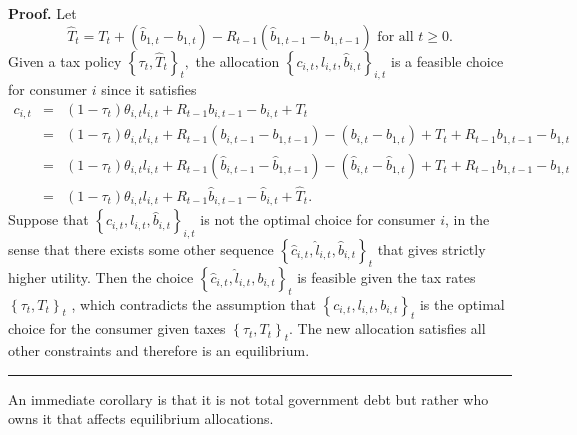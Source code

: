 \documentclass[thmsb,11pt]{article}
\newenvironment{proof}[1][Proof]{\noindent \textbf{#1.} }{\  \rule{0.5em}{0.5em}}
\begin{document}
\begin{proof}
Let
\begin{equation}
\hat{T}_{t}=T_{t} + \left(\hat{b}_{1,t} - b_{1,t}\right) -
R_{t-1}\left(\hat{b}_{1,t-1} - b_{1,t-1}\right) \text{ for
all }t\geq 0.  \label{construct That}
\end{equation}%
Given  a tax policy $\left \{ \tau _{t},\hat{T}_{t}\right \} _{t},$ the
allocation $\left \{ c_{i,t},l_{i,t},\hat{b}_{i,t}\right \}_{i,t}$ is a feasible choice for consumer $i$ since it satisfies%
\begin{eqnarray*}
c_{i,t}&=&\left( 1-\tau _{t}\right) \theta _{i,t}l_{i,t}+R_{t-1}b_{i,t-1}-b_{i,t}+T_{t}\\
&=&\left( 1-\tau _{t}\right) \theta _{i,t}l_{i,t}+R_{t-1}\left( b_{i,t-1}-b_{1,t-1}\right) -\left(
b_{i,t}-b_{1,t}\right) +T_{t}+R_{t-1}b_{1,t-1}-b_{1,t} \\
&=&\left( 1-\tau _{t}\right) \theta _{i,t}l_{i,t}+R_{t-1}\left( \hat{b}_{i,t-1}-\hat{b}_{1,t-1}\right) -\left( \hat{b%
}_{i,t}-\hat{b}_{1,t}\right) +T_{t}+R_{t-1}b_{1,t-1}-b_{1,t} \\
 &=&\left( 1-\tau _{t}\right) \theta
_{i,t}l_{i,t}+R_{t-1}\hat{b}_{i,t-1}-\hat{b}_{i,t}+\hat{T}_{t}.
\end{eqnarray*}%
Suppose that $\left \{ c_{i,t},l_{i,t},\hat{b}_{i,t}\right \}_{i,t}$ is not the optimal choice for consumer $i$, in the sense that there exists some
other sequence $\left \{ \hat{c}_{i,t},\hat{l}_{i,t},\hat{b}_{i,t}\right \}_{t}$ that gives strictly higher utility.  Then the choice $%
\left \{ \hat{c}_{i,t},\hat{l}_{i,t},b_{i,t}\right \}_{t}$ is
feasible given the tax rates  $\left \{ \tau _{t},T_{t}\right \} _{t}$%
, which contradicts the assumption that $\left \{ c_{i,t},l_{i,t},b_{i,t}\right \}_{t}$ is the optimal choice for
the consumer given taxes $\left \{ \tau _{t},T_{t}\right \}
_{t}$. The new allocation satisfies all other constraints and
therefore is an equilibrium.
\end{proof}

\smallskip An immediate corollary is  that it is not
total government debt but rather who owns it that affects equilibrium
allocations.
\end{document}
